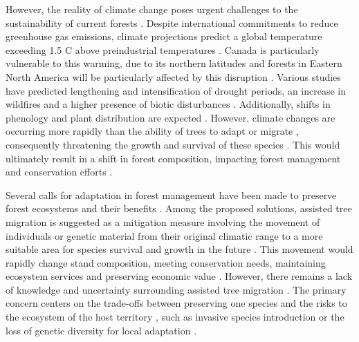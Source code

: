 However, the reality of climate change poses urgent challenges to the sustainability of current forests \citep{McKenney2009Climatechange,Trumbore2015Foresthealth,Seidl2017Forestdisturbances,Messier2022Warningnatural}. 
Despite international commitments to reduce greenhouse gas emissions, climate projections predict a global temperature exceeding 1.5 C above preindustrial temperatures \citep{Matthews2022Currentglobal}. 
Canada is particularly vulnerable to this warming, due to its northern latitudes \citep{Alo2008Potentialfuture,Bush2019Canadachanging} and forests in Eastern North America will be particularly affected by this disruption \citep{Park2014Canboreal,Mahony2017closerlook,Sittaro2017Treerange,Messier2022Warningnatural}. 
Various studies have predicted lengthening and intensification of drought periods, an increase in wildfires and a higher presence of biotic disturbances \citep{Parmesan2007Influencesspecies,Joyce2013Climatechange,Gatti2021Amazoniacarbon,Heidari2021Effectsclimate}. 
Additionally, shifts in phenology and plant distribution are expected \citep{Aitken2008Adaptationmigration,Chuine2010Whydoes,Zhu2012Failuremigrate,Gray2013Trackingsuitable}. 
However, climate changes are occurring more rapidly than the ability of trees to adapt or migrate \citep{Aitken2008Adaptationmigration,Loarie2009velocityclimate,Vitt2010Assistedmigration,Harrison2020Plantcommunity}, 
consequently threatening the growth and survival of these species \citep{Zhu2012Failuremigrate,Sittaro2017Treerange,Woodall2018Decadalchanges}.
This would ultimately result in a shift in forest composition, impacting forest management and conservation efforts \citep{McKenney2009Climatechange,Chmura2011Forestresponses,Lo2011Linkingclimate}.

Several calls for adaptation in forest management have been made to preserve forest ecosystems and their benefits \citep{Nagel2017Adaptivesilviculture,Messier2021sakeresilience}. 
Among the proposed solutions, assisted tree migration is suggested as a mitigation measure involving the movement of individuals or genetic material from their original climatic range to a more suitable area for species survival and growth in the future \citep{Vitt2010Assistedmigration,Dumroese2015Considerationsrestoring,Park2018Informationunderload,Park2023Provenancetrials}. 
This movement would rapidly change stand composition, meeting conservation needs, maintaining ecosystem services and preserving economic value \citep{Pedlar2011implementationassisted,Ste-Marie2011Assistedmigration,Winder2011Ecologicalimplications}. 
However, there remains a lack of knowledge and uncertainty surrounding assisted tree migration \citep{Klenk2015assistedmigration,Park2018Informationunderload}.
The primary concern centers on the trade-offs between preserving one species and the risks to the ecosystem of the host territory \citep{Ricciardi2009Assistedcolonization}, 
such as invasive species introduction or the loss of genetic diversity for local adaptation \citep{McLachlan2007frameworkdebate,Vitt2010Assistedmigration,Hewitt2011Takingstock,VanDaele2022Genomicanalyses}.

